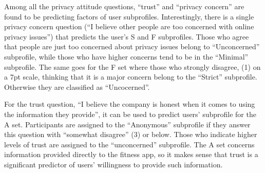 

Among all the privacy attitude questions, ``trust'' and ``privacy concern'' are found to be predicting factors of user subprofiles. Interestingly, there is a single  privacy concern question (``I believe other people are too concerned with online privacy issues'') that predicts the user's S and F subprofiles. Those who agree that people are just too concerned about privacy issues belong to ``Unconcerned'' subprofile, while those who have higher concerns tend to be in the ``Minimal'' subprofile. The same goes for the F set where those who strongly disagree, (1) on a 7pt scale, thinking that it is a major concern belong to the ``Strict'' subprofile. Otherwise they are classified as ``Uncocerned''.


For the trust question, ``I believe the company is honest when it comes to using the information they provide'', it can be used to predict users' subprofile for the A set. Participants are assigned to the ``Anonymous'' subprofile if they answer this question with ``somewhat disagree'' (3) or below. Those who indicate higher levels of trust are assigned to the ``unconcerned'' subprofile. The A set concerns information provided directly to the fitness app, so it makes sense that trust is a significant predictor of users' willingness to provide such information.

